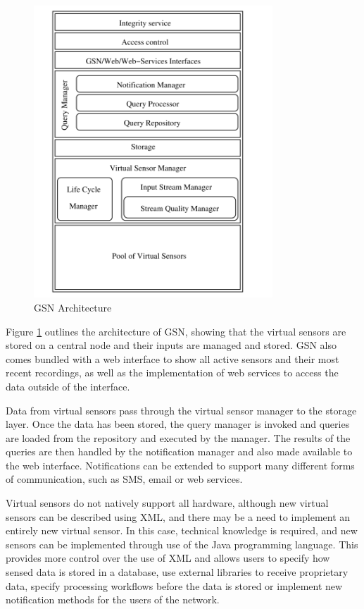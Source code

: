 		\begin{figure}[h]
		\centering
		\includegraphics[width=0.8\textwidth]{Chap2/figures/gsn_arch.png}
		\caption{GSN Architecture \cite{F2006}}
		\label{bg:fig:gsn}
		\end{figure}

Figure \ref{bg:fig:gsn} outlines the architecture of GSN, showing that the virtual sensors are stored on a central node and their inputs are managed and stored. GSN also comes bundled with a web interface to show all active sensors and their most recent recordings, as well as the implementation of web services to access the data outside of the interface.

Data from virtual sensors pass through the virtual sensor manager to the storage layer. Once the data has been stored, the query manager is invoked and queries are loaded from the repository and executed by the manager. The results of the queries are then handled by the notification manager and also made available to the web interface. Notifications can be extended to support many different forms of communication, such as SMS, email or web services.

Virtual sensors do not natively support all hardware, although new virtual sensors can be described using XML, and there may be a need to implement an entirely new virtual sensor. In this case, technical knowledge is required, and new sensors can be implemented through use of the Java programming language. This provides more control over the use of XML and allows users to specify how sensed data is stored in a database, use external libraries to receive proprietary data, specify processing workflows before the data is stored or implement new notification methods for the users of the network.

